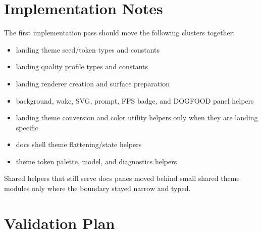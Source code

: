 \section{Implementation Notes}\label{record-117-implementation-notes}

The first implementation pass should move the following clusters together:

\begin{itemize}
\tightlist
\item
  landing theme seed/token types and constants
\item
  landing quality profile types and constants
\item
  landing renderer creation and surface preparation
\item
  background, wake, SVG, prompt, FPS badge, and DOGFOOD panel helpers
\item
  landing theme conversion and color utility helpers only when they are landing specific
\item
  docs shell theme flattening/state helpers
\item
  theme token palette, model, and diagnostics helpers
\end{itemize}

Shared helpers that still serve docs panes moved behind small shared theme modules only where the boundary stayed narrow and typed.

\section{Validation Plan}\label{record-117-validation-plan}

